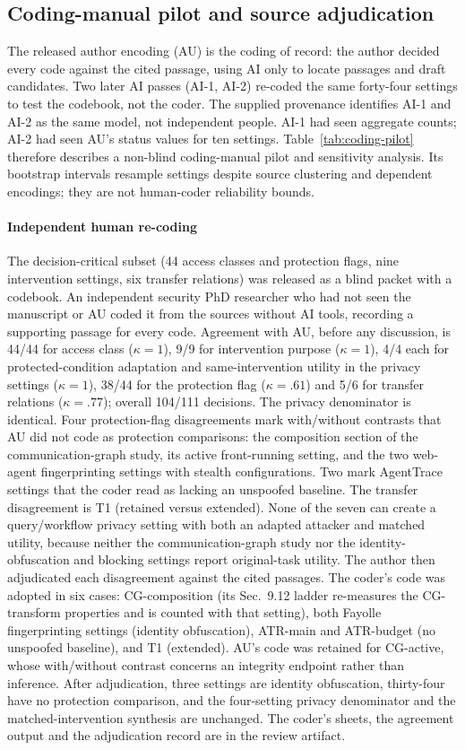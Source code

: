 \subsection{Coding-manual pilot and source adjudication}\label{supp:coding-pilot}
The released author encoding (AU) is the coding of record: the author decided every code against the cited passage, using AI only to locate passages and draft candidates. Two later AI passes (AI-1, AI-2) re-coded the same forty-four settings to test the codebook, not the coder. The supplied provenance identifies AI-1 and AI-2 as the same model, not independent people. AI-1 had seen aggregate counts; AI-2 had seen AU's status values for ten settings. Table~\ref{tab:coding-pilot} therefore describes a non-blind coding-manual pilot and sensitivity analysis. Its bootstrap intervals resample settings despite source clustering and dependent encodings; they are not human-coder reliability bounds. \paragraph{Independent human re-coding} The decision-critical subset (44 access classes and protection flags, nine intervention settings, six transfer relations) was released as a blind packet with a codebook. An independent security PhD researcher who had not seen the manuscript or AU coded it from the sources without AI tools, recording a supporting passage for every code. Agreement with AU, before any discussion, is 44/44 for access class ($\kappa=1$), 9/9 for intervention purpose ($\kappa=1$), 4/4 each for protected-condition adaptation and same-intervention utility in the privacy settings ($\kappa=1$), 38/44 for the protection flag ($\kappa=.61$) and 5/6 for transfer relations ($\kappa=.77$); overall 104/111 decisions. The privacy denominator is identical. Four protection-flag disagreements mark with/without contrasts that AU did not code as protection comparisons: the composition section of the communication-graph study, its active front-running setting, and the two web-agent fingerprinting settings with stealth configurations. Two mark AgentTrace settings that the coder read as lacking an unspoofed baseline. The transfer disagreement is T1 (retained versus extended). None of the seven can create a query/workflow privacy setting with both an adapted attacker and matched utility, because neither the communication-graph study nor the identity-obfuscation and blocking settings report original-task utility. The author then adjudicated each disagreement against the cited passages. The coder's code was adopted in six cases: CG-composition (its Sec.~9.12 ladder re-measures the CG-transform properties and is counted with that setting), both Fayolle fingerprinting settings (identity obfuscation), ATR-main and ATR-budget (no unspoofed baseline), and T1 (extended). AU's code was retained for CG-active, whose with/without contrast concerns an integrity endpoint rather than inference. After adjudication, three settings are identity obfuscation, thirty-four have no protection comparison, and the four-setting privacy denominator and the matched-intervention synthesis are unchanged. The coder's sheets, the agreement output and the adjudication record are in the review artifact.

